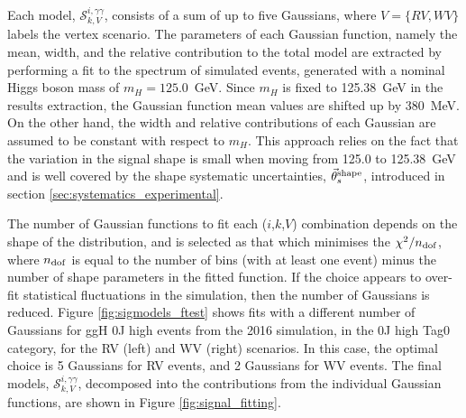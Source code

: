 Each model, $\mathcal{S}^{i,\gamma\gamma}_{k,V}$, consists of a sum of up to five Gaussians, where $V=\{RV,WV\}$ labels the vertex scenario. The parameters of each Gaussian function, namely the mean, width, and the relative contribution to the total model are extracted by performing a fit to the \mgg spectrum of simulated events, generated with a nominal Higgs boson mass of $m_H=125.0$~GeV. 
Since $m_H$ is fixed to 125.38~GeV in the results extraction, the Gaussian function mean values are shifted up by 380~MeV. On the other hand, the width and relative contributions of each Gaussian are assumed to be constant with respect to $m_H$.
This approach relies on the fact that the variation in the signal shape is small when moving from 125.0 to 125.38~GeV and is well covered by the shape systematic uncertainties, $\vec{\theta}^{\rm{shape}}_s$, introduced in section \ref{sec:systematics_experimental}.

The number of Gaussian functions to fit each ($i$,$k$,$V$) combination depends on the shape of the \mgg distribution, and is selected as that which minimises the $\chi^2/n_{\rm{dof}}$, where $n_{\rm{dof}}$ is equal to the number of \mgg bins (with at least one event) minus the number of shape parameters in the fitted function. If the choice appears to over-fit statistical fluctuations in the simulation, then the number of Gaussians is reduced. Figure \ref{fig:sigmodels_ftest} shows fits with a different number of Gaussians for ggH 0J high \ptH events from the 2016 simulation, in the 0J high \ptgg Tag0 category, for the RV (left) and WV (right) scenarios. In this case, the optimal choice is 5 Gaussians for RV events, and 2 Gaussians for WV events. The final models, $\mathcal{S}^{i,\gamma\gamma}_{k,V}$, decomposed into the contributions from the individual Gaussian functions, are shown in Figure \ref{fig:signal_fitting}. 

